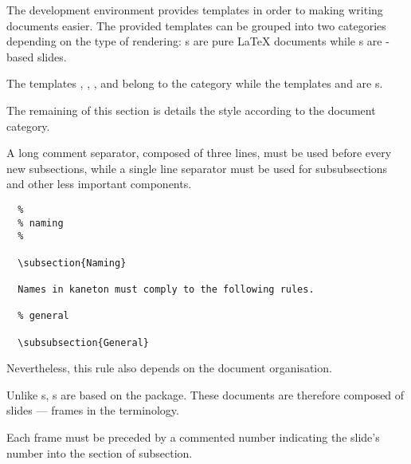 The  development environment provides templates in order to
making writing documents easier. The provided templates can be grouped
into two categories depending on the type of rendering: s
are pure {\LaTeX} documents while s are -based
slides.

The templates , , , 
and  belong to the  category while the templates
 and  are s.

The remaining of this section is details the style according to the document
category.



A long comment separator, composed of three lines, must be used before
every new subsections, while a single line separator must be used for
subsubsections and other less important components.

\begin{verbatim}
  %
  % naming
  %

  \subsection{Naming}

  Names in kaneton must comply to the following rules.

  % general

  \subsubsection{General}
\end{verbatim}

Nevertheless, this rule also depends on the document organisation.



Unlike s, s are based on the 
package. These documents are therefore composed of slides --- frames in the
 terminology.

Each frame must be preceded by a commented number indicating the slide's
number into the section of subsection.

